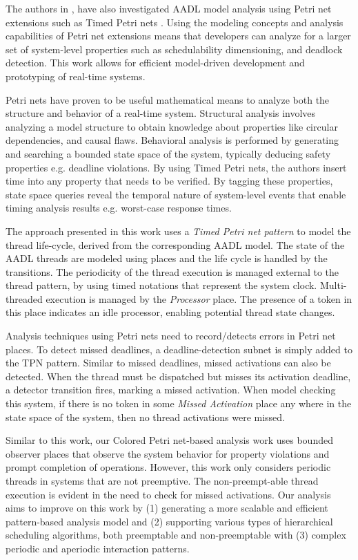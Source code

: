 The authors in \cite{kordon_sn}, have also investigated AADL model analysis using Petri net extensions such as Timed Petri nets \cite{kordon2009}. Using the modeling concepts and analysis capabilities of Petri net extensions means that developers can analyze for a larger set of system-level properties such as schedulability dimensioning, and deadlock detection. This work allows for efficient model-driven development and prototyping of real-time systems. 

Petri nets have proven to be useful mathematical means to analyze both the structure and behavior of a real-time system. Structural analysis involves analyzing a model structure to obtain knowledge about properties like circular dependencies, and causal flaws. Behavioral analysis is performed by generating and searching a bounded state space of the system, typically deducing safety properties e.g. deadline violations. By using Timed Petri nets, the authors insert time into any property that needs to be verified. By tagging these properties, state space queries reveal the temporal nature of system-level events that enable timing analysis results e.g. worst-case response times.

The approach presented in this work uses a \emph{Timed Petri net pattern} to model the thread life-cycle, derived from the corresponding AADL model. The state of the AADL threads are modeled using places and the life cycle is handled by the transitions. The periodicity of the thread execution is managed external to the thread pattern, by using timed notations that represent the system clock. Multi-threaded execution is managed by the \emph{Processor} place. The presence of a token in this place indicates an idle processor, enabling potential thread state changes. 

Analysis techniques using Petri nets need to record/detects errors in Petri net places. To detect missed deadlines, a deadline-detection subnet is simply added to the TPN pattern. Similar to missed deadlines, missed activations can also be detected. When the thread must be dispatched but misses its activation deadline, a detector transition fires, marking a missed activation. When model checking this system, if there is no token in some \emph{Missed Activation} place any where in the state space of the system, then no thread activations were missed. 

Similar to this work, our Colored Petri net-based analysis work uses bounded observer places \cite{Alpern1989} that observe the system behavior for property violations and prompt completion of operations. However, this work \cite{kordon2009} only considers periodic threads in systems that are not preemptive. The non-preempt-able thread execution is evident in the need to check for missed activations. Our analysis aims to improve on this work by (1) generating a more scalable and efficient pattern-based analysis model and (2) supporting various types of hierarchical scheduling algorithms, both preemptable and non-preemptable with (3) complex periodic and aperiodic interaction patterns.


